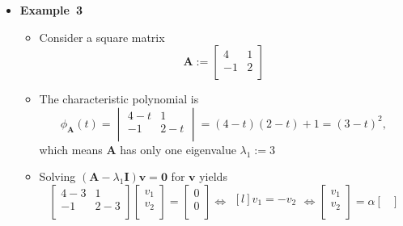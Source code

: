 \documentclass[12pt,a4paper]{article}
\begin{document}
\begin{itemize}
\clearpage
\item \textbf{Example~3}
  \begin{itemize}
  \item Consider a square matrix
    \begin{equation}\nonumber%
      \bm{A} :=
      \begin{bmatrix}
        4 & 1 \\
        -1 & 2 \\
      \end{bmatrix}
    \end{equation}
  \item The characteristic polynomial is
    \begin{equation}\nonumber%
      \phi_{\bm{A}}(t) = 
      \begin{vmatrix}
        4 -t & 1 \\
        -1 & 2-t \\
      \end{vmatrix}
      = (4-t)(2-t) + 1
      = (3-t)^{2},
    \end{equation}
    which means $\bm{A}$ has only one eigenvalue $\lambda_{1}:=3$
  \item Solving $(\bm{A}-\lambda_{1}\bm{I})\bm{v}=\bm{0}$ for $\bm{v}$ yields
    \begin{equation}\nonumber%
      \begin{bmatrix}
        4 - 3 & 1 \\
        - 1 & 2 - 3 \\
      \end{bmatrix}
      \begin{bmatrix}
        v_{1} \\
        v_{2} \\
      \end{bmatrix}
      = 
      \begin{bmatrix}
        0 \\
        0 \\
      \end{bmatrix}
      \iff
      \begin{matrix*}[l]
        v_{1} = -v_{2} \\
      \end{matrix*}
      \iff
      \begin{bmatrix}
        v_{1} \\
        v_{2} \\
      \end{bmatrix}
      =
      \alpha
      \begin{bmatrix}

\end{bmatrix}
\end{equation}
\end{itemize}
\end{itemize}
\end{document}
